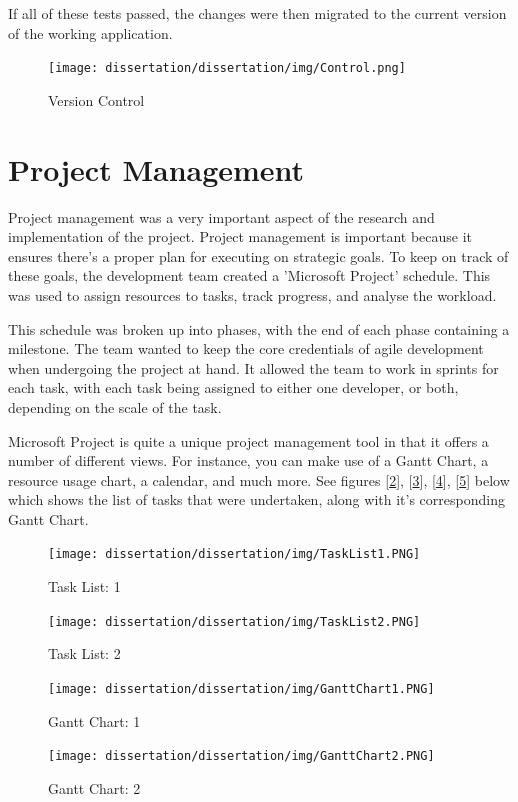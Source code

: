 \clearpage

If all of these tests passed, the changes were then migrated to the current version of the working application.

\bigskip

\begin{figure}[H]
    \centering
    \texttt{[image: dissertation/dissertation/img/Control.png]}
    \caption{Version Control}
    \label{fig:my_label}
\end{figure}


\bigskip
\section{Project Management}
\label{sec:MethodologyProjectManagement}

Project management was a very important aspect of the research and implementation of the project. Project management is important because it ensures there's a proper plan for executing on strategic goals. To keep on track of these goals, the development team created a 'Microsoft Project' schedule. This was used to assign resources to tasks, track progress, and analyse the workload.

\bigskip

This schedule was broken up into phases, with the end of each phase containing a milestone. The team wanted to keep the core credentials of agile development when undergoing the project at hand. It allowed the team to work in sprints for each task, with each task being assigned to either one developer, or both, depending on the scale of the task.

\bigskip

Microsoft Project is quite a unique project management tool in that it offers a number of different views. For instance, you can make use of a Gantt Chart, a resource usage chart, a calendar, and much more. See figures [\ref{fig:my_label1}], [\ref{fig:my_label2}], [\ref{fig:my_label3}], [\ref{fig:my_label4}] below which shows the list of tasks that were undertaken, along with it's corresponding Gantt Chart.

\begin{figure}[H]
    \centering
    \texttt{[image: dissertation/dissertation/img/TaskList1.PNG]}
    \caption{Task List: 1}
    \label{fig:my_label1}
\end{figure}
\begin{figure}[H]
    \centering
    \texttt{[image: dissertation/dissertation/img/TaskList2.PNG]}
    \caption{Task List: 2}
    \label{fig:my_label2}
\end{figure}
\begin{figure}[H]
    \centering
    \texttt{[image: dissertation/dissertation/img/GanttChart1.PNG]}
    \caption{Gantt Chart: 1}
    \label{fig:my_label3}
\end{figure}
\begin{figure}[H]
    \centering
    \texttt{[image: dissertation/dissertation/img/GanttChart2.PNG]}
    \caption{Gantt Chart: 2}
    \label{fig:my_label4}
\end{figure}




